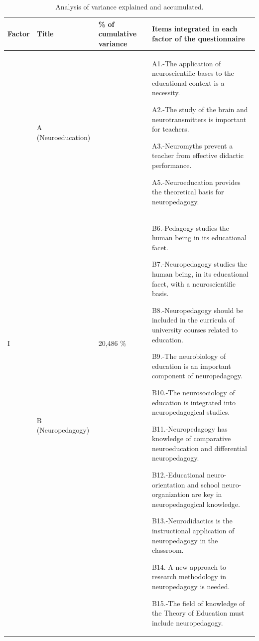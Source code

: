 \documentclass[english]{textolivre}
\begin{document}
\begin{table}[h!]
\begin{threeparttable}
\caption{Analysis of variance explained and accumulated.}
\label{tab01}
\centering
\begin{tabular}{p{0.8cm} p{1.5cm} p{1.5cm} p{9.1cm}}
\toprule
Factor & Title & \% of cumulative variance & Items integrated in each factor of the questionnaire \\
\midrule
\multirow{4}{*}{I} & 
A \newline (Neuro\-education) & 
\multirow{4}{*}{20,486 \%} & 
A1.-The application of neuroscientific bases to the educational context is a necessity.

A2.-The study of the brain and neurotransmitters is important for teachers.

A3.-Neuromyths prevent a teacher from effective didactic performance.

A5.-Neuroeducation provides the theoretical basis for neuropedagogy. \\

 & B \newline(Neuro\-pedagogy) & & 
B6.-Pedagogy studies the human being in its educational facet.
 
B7.-Neuropedagogy studies the human being, in its educational facet, with a neuroscientific basis.

B8.-Neuropedagogy should be included in the curricula of university courses related to education.

B9.-The neurobiology of education is an important component of neuropedagogy.

B10.-The neurosociology of education is integrated into neuropedagogical studies.

B11.-Neuropedagogy has knowledge of comparative neuroeducation and differential neuropedagogy.

B12.-Educational neuro-orientation and school neuro-organization are key in neuropedagogical knowledge.

B13.-Neurodidactics is the instructional application of neuropedagogy in the classroom.

B14.-A new approach to research methodology in neuropedagogy is needed.

B15.-The field of knowledge of the Theory of Education must include neuropedagogy. \\


\end{tabular}
\end{threeparttable}
\end{table}
\end{document}
